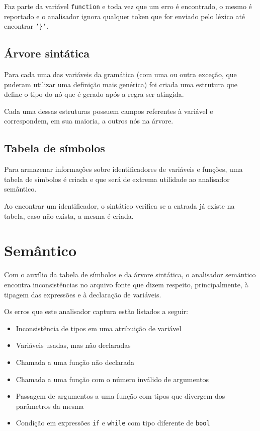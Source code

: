 \documentclass[12pt]{article}
\begin{document}
Faz parte da variável \texttt{function} e toda vez que um erro é encontrado, o mesmo é reportado e o analisador ignora qualquer token que for enviado pelo léxico até encontrar \texttt{'\}'}.


\subsection{Árvore sintática}

Para cada uma das variáveis da gramática (com uma ou outra exceção, que puderam utilizar uma definição mais genérica) foi criada uma estrutura que define o tipo do nó que é gerado após a regra ser atingida.

Cada uma dessas estruturas possuem campos referentes à variável e correspondem, em sua maioria, a outros nós na árvore.

\subsection{Tabela de símbolos}

Para armazenar informações sobre identificadores de variáveis e funções, uma tabela de símbolos é criada e que será de extrema utilidade ao analisador semântico.

Ao encontrar um identificador, o sintático verifica se a entrada já existe na tabela, caso não exista, a mesma é criada.

\section{Semântico}

Com o auxílio da tabela de símbolos e da árvore sintática, o analisador semãntico encontra inconsistências no arquivo fonte que dizem respeito, principalmente, à tipagem das expressões e à declaração de variáveis.

Os erros que este analisador captura estão listados a seguir:
\begin{itemize}
\item Inconsistência de tipos em uma atribuição de variável
\item Variáveis usadas, mas não declaradas
\item Chamada a uma função não declarada
\item Chamada a uma função com o número inválido de argumentos
\item Passagem de argumentos a uma função com tipos que divergem dos parâmetros da mesma
\item Condição em expressões \texttt{if} e \texttt{while} com tipo diferente de \texttt{bool}
\end{itemize}
\end{document}
